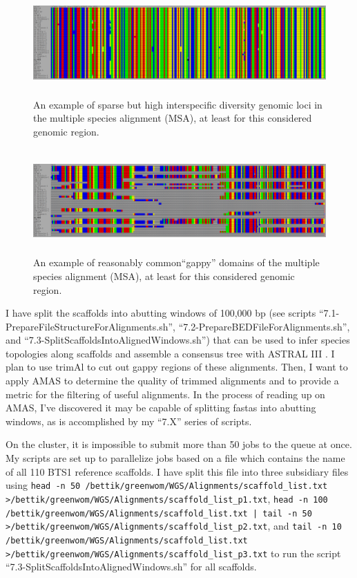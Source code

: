 \documentclass[12pt]{report}
\begin{document}
 \begin{figure}[!h]
         \centering
         \includegraphics[height=4cm]{Images/SeaViewMSA_2.PNG}
         \caption{An example of sparse but high interspecific diversity genomic loci in the multiple species alignment (MSA), at least for this considered genomic region.}
 \end{figure}

 \begin{figure}[!h]
         \centering
         \includegraphics[height=4cm]{Images/SeaViewMSA_3.PNG}
         \caption{An example of reasonably common``gappy'' domains of the multiple species alignment (MSA), at least for this considered genomic region.}
 \end{figure}

I have split the scaffolds into abutting windows of 100,000 bp (see scripts ``7.1-PrepareFileStructureForAlignments.sh'', ``7.2-PrepareBEDFileForAlignments.sh'', and ``7.3-SplitScaffoldsIntoAlignedWindows.sh'') that can be used to infer species topologies along scaffolds and assemble a consensus tree with ASTRAL III \cite{zhang2018}. I plan to use trimAl to cut out gappy regions of these alignments. Then, I want to apply AMAS \cite{borowiec2016} to determine the quality of trimmed alignments and to provide a metric for the filtering of useful alignments. In the process of reading up on AMAS, I've discovered it may be capable of splitting fastas into abutting windows, as is accomplished by my ``7.X'' series of scripts.

On the cluster, it is impossible to submit more than 50 jobs to the queue at once. My scripts are set up to parallelize jobs based on a file which contains the name of all 110 BTS1 reference scaffolds. I have split this file into three subsidiary files using \verb!head -n 50 /bettik/greenwom/WGS/Alignments/scaffold_list.txt >/bettik/greenwom/WGS/Alignments/scaffold_list_p1.txt!, \verb!head -n 100 /bettik/greenwom/WGS/Alignments/scaffold_list.txt | tail -n 50 >/bettik/greenwom/WGS/Alignments/scaffold_list_p2.txt!, and \verb!tail -n 10 /bettik/greenwom/WGS/Alignments/scaffold_list.txt >/bettik/greenwom/WGS/Alignments/scaffold_list_p3.txt! to run the script ``7.3-SplitScaffoldsIntoAlignedWindows.sh'' for all scaffolds. \\
\end{document}
